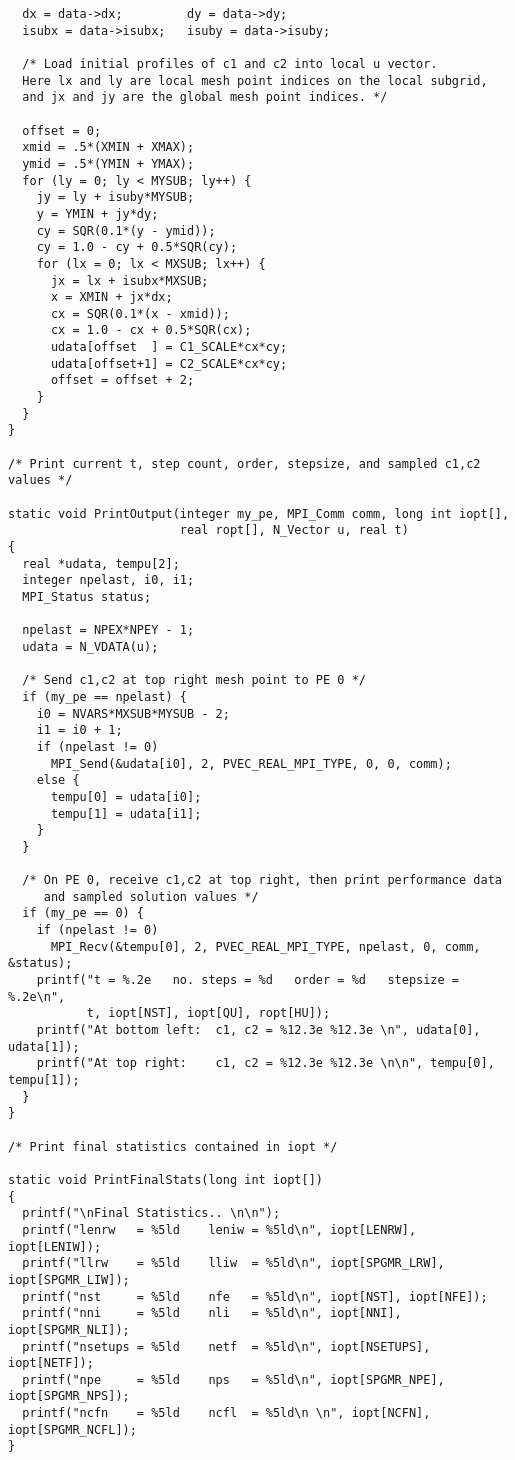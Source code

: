 \begin{verbatim}
  dx = data->dx;         dy = data->dy;
  isubx = data->isubx;   isuby = data->isuby;

  /* Load initial profiles of c1 and c2 into local u vector.
  Here lx and ly are local mesh point indices on the local subgrid,
  and jx and jy are the global mesh point indices. */

  offset = 0;
  xmid = .5*(XMIN + XMAX);
  ymid = .5*(YMIN + YMAX);
  for (ly = 0; ly < MYSUB; ly++) {
    jy = ly + isuby*MYSUB;
    y = YMIN + jy*dy;
    cy = SQR(0.1*(y - ymid));
    cy = 1.0 - cy + 0.5*SQR(cy);
    for (lx = 0; lx < MXSUB; lx++) {
      jx = lx + isubx*MXSUB;
      x = XMIN + jx*dx;
      cx = SQR(0.1*(x - xmid));
      cx = 1.0 - cx + 0.5*SQR(cx);
      udata[offset  ] = C1_SCALE*cx*cy; 
      udata[offset+1] = C2_SCALE*cx*cy;
      offset = offset + 2;
    }
  }
}

/* Print current t, step count, order, stepsize, and sampled c1,c2 values */

static void PrintOutput(integer my_pe, MPI_Comm comm, long int iopt[], 
                        real ropt[], N_Vector u, real t)
{
  real *udata, tempu[2];
  integer npelast, i0, i1;
  MPI_Status status;

  npelast = NPEX*NPEY - 1;
  udata = N_VDATA(u);

  /* Send c1,c2 at top right mesh point to PE 0 */
  if (my_pe == npelast) {
    i0 = NVARS*MXSUB*MYSUB - 2;
    i1 = i0 + 1;
    if (npelast != 0)
      MPI_Send(&udata[i0], 2, PVEC_REAL_MPI_TYPE, 0, 0, comm);
    else {
      tempu[0] = udata[i0];
      tempu[1] = udata[i1];
    }
  }

  /* On PE 0, receive c1,c2 at top right, then print performance data
     and sampled solution values */ 
  if (my_pe == 0) {
    if (npelast != 0)
      MPI_Recv(&tempu[0], 2, PVEC_REAL_MPI_TYPE, npelast, 0, comm, &status);
    printf("t = %.2e   no. steps = %d   order = %d   stepsize = %.2e\n",
           t, iopt[NST], iopt[QU], ropt[HU]);
    printf("At bottom left:  c1, c2 = %12.3e %12.3e \n", udata[0], udata[1]);
    printf("At top right:    c1, c2 = %12.3e %12.3e \n\n", tempu[0], tempu[1]);
  }
}

/* Print final statistics contained in iopt */

static void PrintFinalStats(long int iopt[])
{
  printf("\nFinal Statistics.. \n\n");
  printf("lenrw   = %5ld    leniw = %5ld\n", iopt[LENRW], iopt[LENIW]);
  printf("llrw    = %5ld    lliw  = %5ld\n", iopt[SPGMR_LRW], iopt[SPGMR_LIW]);
  printf("nst     = %5ld    nfe   = %5ld\n", iopt[NST], iopt[NFE]);
  printf("nni     = %5ld    nli   = %5ld\n", iopt[NNI], iopt[SPGMR_NLI]);
  printf("nsetups = %5ld    netf  = %5ld\n", iopt[NSETUPS], iopt[NETF]);
  printf("npe     = %5ld    nps   = %5ld\n", iopt[SPGMR_NPE], iopt[SPGMR_NPS]);
  printf("ncfn    = %5ld    ncfl  = %5ld\n \n", iopt[NCFN], iopt[SPGMR_NCFL]);
}
 

\end{verbatim}
